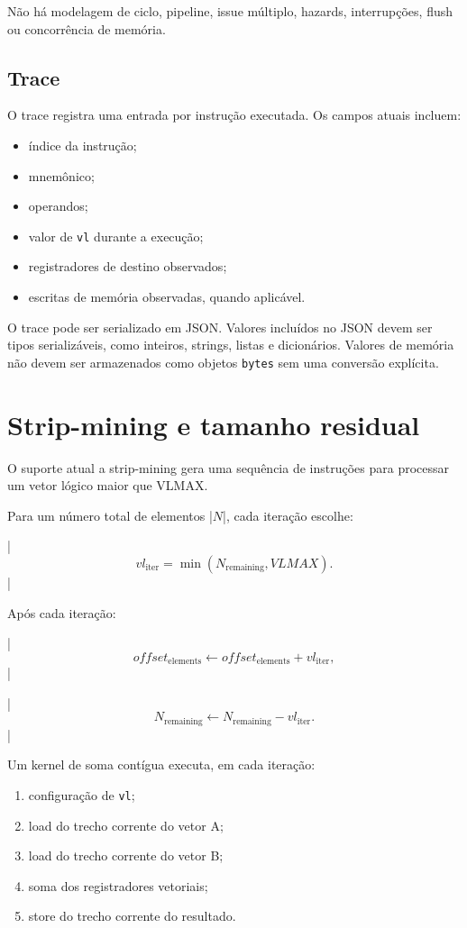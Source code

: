 Não há modelagem de ciclo, pipeline, issue múltiplo, hazards,
interrupções, flush ou concorrência de memória.

\subsection{Trace}

O trace registra uma entrada por instrução executada. Os campos atuais
incluem:

\begin{itemize}
    \item índice da instrução;
    \item mnemônico;
    \item operandos;
    \item valor de \texttt{vl} durante a execução;
    \item registradores de destino observados;
    \item escritas de memória observadas, quando aplicável.
\end{itemize}

O trace pode ser serializado em JSON. Valores incluídos no JSON devem
ser tipos serializáveis, como inteiros, strings, listas e dicionários.
Valores de memória não devem ser armazenados como objetos \texttt{bytes}
sem uma conversão explícita.

\section{Strip-mining e tamanho residual}

O suporte atual a strip-mining gera uma sequência de instruções para
processar um vetor lógico maior que VLMAX.

Para um número total de elementos |$N$|, cada iteração escolhe:

|$$
vl_{\text{iter}} = \min(N_{\text{remaining}},VLMAX).
$$|

Após cada iteração:

|$$
offset_{\text{elements}} \leftarrow
offset_{\text{elements}} + vl_{\text{iter}},
$$|

|$$
N_{\text{remaining}} \leftarrow
N_{\text{remaining}} - vl_{\text{iter}}.
$$|

Um kernel de soma contígua executa, em cada iteração:

\begin{enumerate}
    \item configuração de \texttt{vl};
    \item load do trecho corrente do vetor A;
    \item load do trecho corrente do vetor B;
    \item soma dos registradores vetoriais;
    \item store do trecho corrente do resultado.
\end{enumerate}

